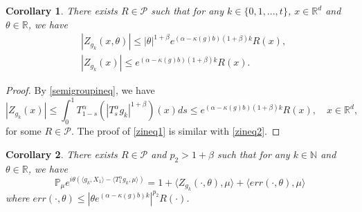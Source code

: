 \documentclass{article}
\newtheorem{corollary}{Corollary}[section]
\begin{document}
\begin{corollary}\label{corollary2}
  There exists $R \in \mathcal{P}$ such that for any $k\in\{0,1,...,t\}$, $x\in \mathbb{R}^d$ and $\theta\in \mathbb{R}$, we have 
  \begin{align}
       &|Z_{g_k}(x,\theta)|\leq |\theta|^{1+\beta}e^{(\alpha-\kappa(g)b)(1+\beta)k}R(x) \label{zineq1},\\
       &|Z_{g_k}(x)|\leq e^{(\alpha-\kappa(g)b)(1+\beta)k}R(x). \label{zineq2}
  \end{align}
  \end{corollary}
  
\begin{proof}
     By \eqref{semigroupineq}, we have
   $$|Z_{g_k}(x)|\leq \int_0^1 T_{1-s}^{\alpha}(|T_s^{\alpha}g_k|^{1+\beta})(x)ds\leq  e^{(\alpha-\kappa(g)b)(1+\beta)k}R(x), \quad x\in \mathbb{R}^d,$$
   for some $R\in \mathcal{P}$. The proof of \eqref{zineq1} is similar with \eqref{zineq2}.
\end{proof}


\begin{corollary}\label{corollary1}
There exists $R \in \mathcal{P}$ and $p_2 >1+\beta$ such that for any $k \in \mathbb{N}$ and $\theta \in \mathbb{R}$, we have 
$$\mathbb{P}_{\mu}e^{i\theta(\langle g_k, X_1\rangle-\langle T_1^{\alpha}g_k,\mu \rangle)}=1+\langle Z_{g_k}(\cdot,\theta),\mu\rangle+\langle err(\cdot,\theta),\mu\rangle$$
where $err(\cdot,\theta)\leq |\theta e^{(\alpha-\kappa(g)b)k}|^{p_2}R(\cdot)$.
\end{corollary}
\end{document}
